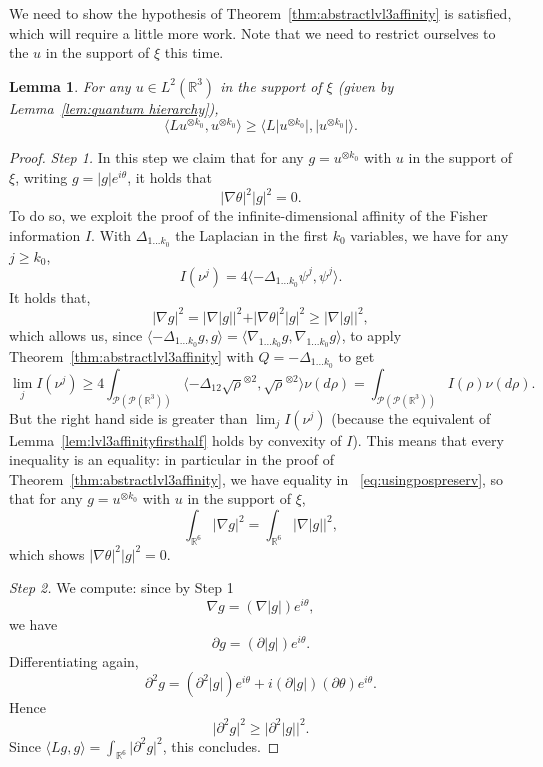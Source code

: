 \documentclass[11pt,a4paper]{article}
\theoremstyle{definition}
\theoremstyle{plain}
\newtheorem{lemma}[defi]{Lemma}
\begin{document}
    We need to show the hypothesis of Theorem~\ref{thm:abstractlvl3affinity} is satisfied, which will require a little more work. Note that we need to restrict ourselves to the $u$ in the support of $\xi$ this time.
    \begin{lemma}
    \label{lem:pospreservingL}
        For any $u\in L^2(\mathbb{R}^{3})$ in the support of $\xi$ (given by Lemma~\ref{lem:quantum hierarchy}),
        $$\langle L u^{\otimes k_0},u^{\otimes k_0}\rangle \geq \langle L \vert u^{\otimes k_0}\vert,\vert u^{\otimes k_0}\vert\rangle.$$
    \end{lemma}
    \begin{proof}
        \textit{Step 1.} In this step we claim that for any $g=u^{\otimes k_0}$ with $u$ in the support of $\xi$, writing $g=\vert g\vert e^{i\theta}$, it holds that
        $$\vert \nabla \theta \vert^2\vert g \vert^2=0.$$
        To do so, we exploit the proof of the infinite-dimensional affinity of the Fisher information $I$. With $\Delta_{1...k_0}$ the Laplacian in the first $k_0$ variables, we have for any $j\geq k_0$,
        $$I(\nu^j)=4\langle -\Delta_{1...k_0} \psi^j,\psi^j\rangle.$$
        It holds that,
        $$\vert \nabla g\vert^2 =\vert \nabla \vert g\vert\vert^2+\vert \nabla \theta \vert^2\vert g \vert^2\geq \vert \nabla \vert g\vert\vert^2,$$
        which allows us, since $\langle -\Delta_{1...k_0} g,g\rangle =\langle \nabla_{1...k_0} g,\nabla_{1...k_0} g\rangle $, to apply Theorem~\ref{thm:abstractlvl3affinity} with $Q=-\Delta_{1...k_0}$ to get
        $$\lim_j I(\nu^j) \geq 4\int_{\mathcal{P}(\mathcal{P}(\mathbb{R}^{3}))} \langle -\Delta_{12} \sqrt\rho^{\otimes 2},\sqrt\rho^{\otimes 2}\rangle \nu(d\rho)=\int_{\mathcal{P}(\mathcal{P}(\mathbb{R}^{3}))} I(\rho) \nu(d\rho).$$
        But the right hand side is greater than $\lim_j I(\nu^j)$ (because the equivalent of Lemma~\ref{lem:lvl3affinityfirsthalf} holds by convexity of $I$). This means that every inequality is an equality: in particular in the proof of Theorem~\ref{thm:abstractlvl3affinity}, we have equality in ~\eqref{eq:usingpospreserv}, so that for any $g=u^{\otimes k_0}$ with $u$ in the support of $\xi$,
        $$\int_{\mathbb{R}^6}\vert \nabla g\vert^2 =\int_{\mathbb{R}^6}\vert \nabla \vert g\vert\vert^2,$$
        which shows $\vert \nabla \theta \vert^2\vert g \vert^2=0.$
        
        \noindent\textit{Step 2.} We compute: since by Step 1
        $$\nabla g = (\nabla\vert g\vert )e^{i\theta}, $$
        we have
        $$\partial g =( \partial\vert g\vert )e^{i\theta}. $$
        Differentiating again,
        $$\partial^2 g = (\partial^2\vert g\vert) e^{i\theta}+i( \partial\vert g\vert )(\partial\theta )e^{i\theta}.$$
        Hence 
        $$\vert\partial^2 g\vert^2\geq\vert\partial^2 \vert g\vert \vert^2. $$
        Since $\langle L g,g\rangle = \int_{\mathbb{R}^6} \vert\partial^2 g\vert^2$, this concludes.
    \end{proof}
\end{document}
